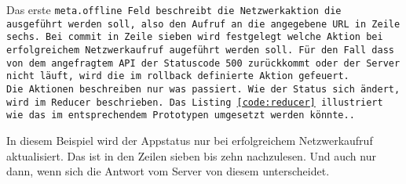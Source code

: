 Das erste \tt{meta.offline} Feld beschreibt die Netzwerkaktion die ausgeführt werden soll, also den Aufruf an die angegebene URL in Zeile sechs. Bei \tt{commit} in Zeile sieben wird festgelegt welche Aktion bei erfolgreichem Netzwerkaufruf augeführt werden soll. Für den Fall dass von dem angefragtem \gls{API} der Statuscode 500 zurückkommt oder der Server nicht läuft, wird die im \tt{rollback} definierte Aktion gefeuert.\\
Die Aktionen beschreiben nur was passiert. Wie der Status sich ändert, wird im \tt{Reducer} beschrieben. Das Listing \ref{code:reducer} illustriert wie das im entsprechendem Prototypen umgesetzt werden könnte..
\begin{center}
  
\end{center}
In diesem Beispiel wird der Appstatus nur bei erfolgreichem Netzwerkaufruf aktualisiert. Das ist in den Zeilen sieben bis zehn nachzulesen. Und auch nur dann, wenn sich die Antwort vom Server von diesem unterscheidet.
%
%
%
